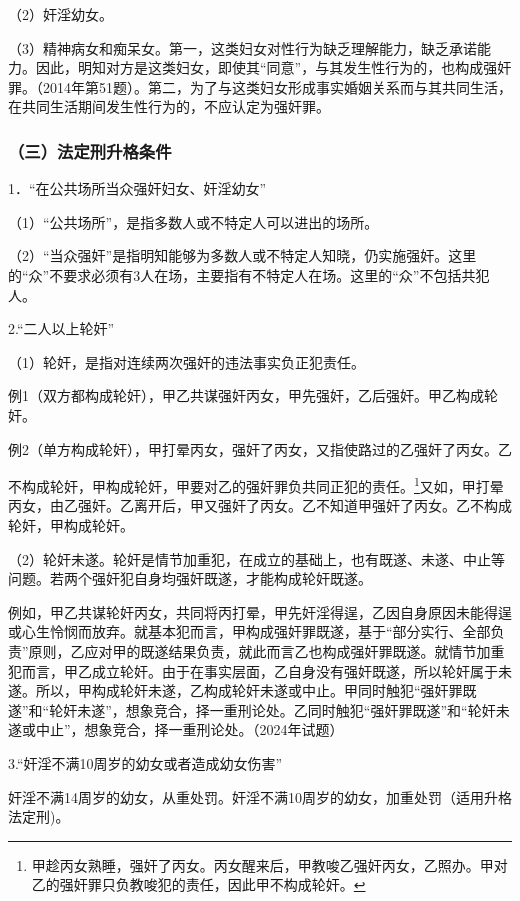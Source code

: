 （2）奸淫幼女。


（3）精神病女和痴呆女。第一，这类妇女对性行为缺乏理解能力，缺乏承诺能力。因此，明知对方是这类妇女，即使其“同意”，与其发生性行为的，也构成强奸罪。（2014年第51题）。第二，为了与这类妇女形成事实婚姻关系而与其共同生活，在共同生活期间发生性行为的，不应认定为强奸罪。

\subsubsection*{（三）法定刑升格条件}

1．“在公共场所当众强奸妇女、奸淫幼女”

（1）“公共场所”，是指多数人或不特定人可以进出的场所。

（2）“当众强奸”是指明知能够为多数人或不特定人知晓，仍实施强奸。这里的“众”不要求必须有3人在场，主要指有不特定人在场。这里的“众”不包括共犯人。

2.“二人以上轮奸”

（1）轮奸，是指对连续两次强奸的违法事实负正犯责任。

例1（双方都构成轮奸），甲乙共谋强奸丙女，甲先强奸，乙后强奸。甲乙构成轮奸。

例2（单方构成轮奸），甲打晕丙女，强奸了丙女，又指使路过的乙强奸了丙女。乙

不构成轮奸，甲构成轮奸，甲要对乙的强奸罪负共同正犯的责任。\footnote{甲趁丙女熟睡，强奸了丙女。丙女醒来后，甲教唆乙强奸丙女，乙照办。甲对乙的强奸罪只负教唆犯的责任，因此甲不构成轮奸。}又如，甲打晕丙女，由乙强奸。乙离开后，甲又强奸了丙女。乙不知道甲强奸了丙女。乙不构成轮奸，甲构成轮奸。

（2）轮奸未遂。轮奸是情节加重犯，在成立的基础上，也有既遂、未遂、中止等问题。若两个强奸犯自身均强奸既遂，才能构成轮奸既遂。

例如，甲乙共谋轮奸丙女，共同将丙打晕，甲先奸淫得逞，乙因自身原因未能得逞或心生怜悯而放弃。就基本犯而言，甲构成强奸罪既遂，基于“部分实行、全部负责”原则，乙应对甲的既遂结果负责，就此而言乙也构成强奸罪既遂。就情节加重犯而言，甲乙成立轮奸。由于在事实层面，乙自身没有强奸既遂，所以轮奸属于未遂。所以，甲构成轮奸未遂，乙构成轮奸未遂或中止。甲同时触犯“强奸罪既遂”和“轮奸未遂”，想象竞合，择一重刑论处。乙同时触犯“强奸罪既遂”和“轮奸未遂或中止”，想象竞合，择一重刑论处。（2024年试题）

3.“奸淫不满10周岁的幼女或者造成幼女伤害”

奸淫不满14周岁的幼女，从重处罚。奸淫不满10周岁的幼女，加重处罚（适用升格法定刑)。

